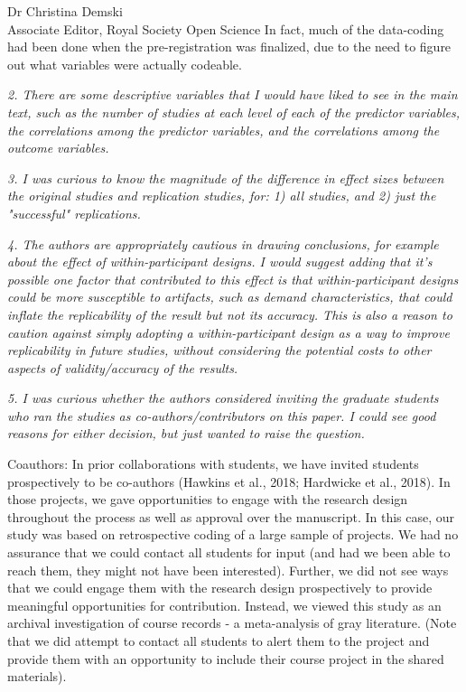 \documentclass{stanfordletter}
\newcommand{\theysaid}[1]{\begin{leftbar} \noindent 
		\textsl{ #1}\end{leftbar}}
\begin{document}
\begin{letter}{Dr Christina Demski \\ Associate Editor, Royal Society Open Science}
          In fact, much of the data-coding had been done when the pre-registration was finalized, due to the need to figure out what variables were actually codeable. 
          
          
          
          \theysaid{
          	2. There are some descriptive variables that I would have liked to see in the main text, such as the number of studies at each level of each of the predictor variables, the correlations among the predictor variables, and the correlations among the outcome variables.
          }
          
          \theysaid{
          	3. I was curious to know the magnitude of the difference in effect sizes between the original studies and replication studies, for: 1) all studies, and 2) just the "successful" replications.
          }
          
          \theysaid{
          	4. The authors are appropriately cautious in drawing conclusions, for example about the effect of within-participant designs.  I would suggest adding that it's possible one factor that contributed to this effect is that within-participant designs could be more susceptible to artifacts, such as demand characteristics, that could inflate the replicability of the result but not its accuracy.  This is also a reason to caution against simply adopting a within-participant design as a way to improve replicability in future studies, without considering the potential costs to other aspects of validity/accuracy of the results.
          }
          \theysaid{
          	5. I was curious whether the authors considered inviting the graduate students who ran the studies as co-authors/contributors on this paper. I could see good reasons for either decision, but just wanted to raise the question.
          }
          
          Coauthors: In prior collaborations with students, we have invited students prospectively to be co-authors (Hawkins et al., 2018; Hardwicke et al., 2018). In those projects, we gave opportunities to engage with the research design throughout the process as well as approval over the manuscript. In this case, our study was based on retrospective coding of a large sample of projects. We had no assurance that we could contact all students for input (and had we been able to reach them, they might not have been interested). Further, we did not see ways that we could engage them with the research design prospectively to provide meaningful opportunities for contribution. Instead, we viewed this study as an archival investigation of course records - a meta-analysis of gray literature. (Note that we did attempt to contact all students to alert them to the project and provide them with an opportunity to include their course project in the shared materials).
          

\end{letter}
\end{document}
